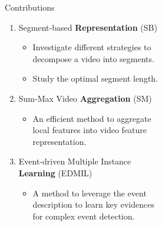 \documentclass{beamer}
\begin{document}
\begin{frame}[t]{Contributions}
	
	\begin{enumerate}
		\item Segment-based \textbf{Representation} (SB)
		\begin{itemize}
			\item Investigate different strategies to \\
			decompose a video into segments.
			\item Study the optimal segment length.
		\end{itemize}
		\item Sum-Max Video \textbf{Aggregation} (SM)
		\begin{itemize}
			\item An efficient method to aggregate\\
			local features into video feature \\
			representation.
		\end{itemize}
		\item Event-driven Multiple Instance \\
				\textbf{Learning} (EDMIL)
		\begin{itemize}
			\item A method to leverage the event\\
			 description to learn key evidences \\
			 for complex event detection.
		\end{itemize}
	\end{enumerate}
	

\end{frame}
\end{document}
